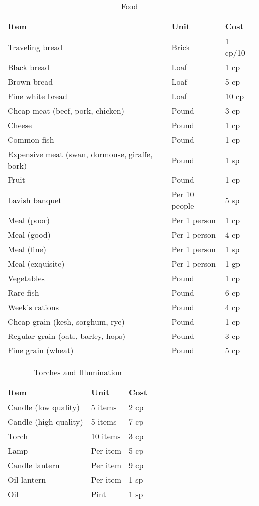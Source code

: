 \documentclass[oneside,11pt,english]{book}
\begin{document}
\begin{table}[hb]
  \centering
  \caption{Food}
  \label{tab:Food}
  \begin{tabu} spread 0pt {*{3}{X[-1]}}
    Item &Unit &Cost\\\toprule
    Traveling bread &Brick &1 cp/10\\
    Black bread &Loaf &1 cp\\
    Brown bread &Loaf &5 cp\\
    Fine white bread &Loaf &10 cp\\
    Cheap meat (beef, pork, chicken) &Pound &3 cp\\
    Cheese &Pound &1 cp\\
    Common fish &Pound &1 cp\\
    Expensive meat (swan, dormouse, giraffe, bork) &Pound &1 sp\\
    Fruit &Pound &1 cp\\
    Lavish banquet &Per 10 people &5 sp\\
    Meal (poor) &Per 1 person &1 cp\\
    Meal (good) &Per 1 person &4 cp\\
    Meal (fine) &Per 1 person &1 sp\\
    Meal (exquisite) &Per 1 person &1 gp\\
    Vegetables &Pound &1 cp\\
    Rare fish &Pound &6 cp\\
    Week's rations &Pound &4 cp\\
    Cheap grain (kesh, sorghum, rye) &Pound &1 cp\\
    Regular grain (oats, barley, hops) &Pound &3 cp\\
    Fine grain (wheat) &Pound &5 cp\\
  \end{tabu}
\end{table}

\begin{table}[hb]
  \centering
  \caption{Torches and Illumination}
  \label{tab:Torches and Illumination}
  \begin{tabu} spread 0pt {*{3}{X[-1]}}
    Item &Unit &Cost\\\toprule
    Candle (low quality) &5 items &2 cp\\
    Candle (high quality) &5 items &7 cp\\
    Torch &10 items &3 cp\\
    Lamp &Per item &5 cp\\
    Candle lantern &Per item &9 cp\\
    Oil lantern &Per item &1 sp\\
    Oil &Pint &1 sp\\
  \end{tabu}
\end{table}
\end{document}
